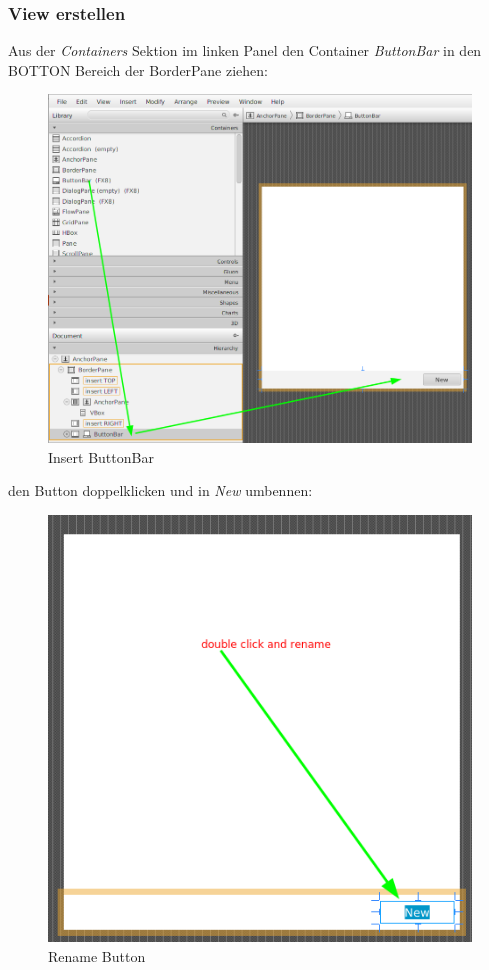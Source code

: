 \documentclass[11pt]{scrartcl}
\begin{document}
\subsubsection{View erstellen}
\label{sec:createview}
Aus der \textit{Containers} Sektion im linken
Panel den Container \textit{ButtonBar} in den BOTTON Bereich
der BorderPane ziehen:
\begin{figure}[!ht]
    \includegraphics[width=\linewidth]{images/eclipse27_insert_buttonbar.png}
    \caption{Insert ButtonBar}
    \label{fig:insertbuttonbar}
\end{figure}

\newpage
den Button doppelklicken und in \textit{New} umbennen:
\begin{figure}[!ht]
    \includegraphics[width=\linewidth]{images/eclipse28_rename_button.png}
    \caption{Rename Button}
    \label{fig:renamebutton}
\end{figure}
\end{document}

